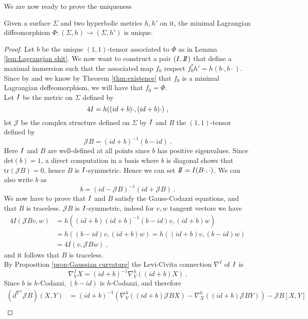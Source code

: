 We are now ready to prove the uniqueness
\begin{theorem}
    Given a surface $\Sigma$ and two hyperbolic metrics $h, h'$ on it, the minimal Lagrangian diffeomorphism $\Phi : (\Sigma, h) \to (\Sigma, h')$ is unique.
\end{theorem}
\begin{proof}
    Let $b$ be the unique $(1,1)$-tensor associated to $\Phi$ as in Lemma \ref{lem:Lagrangian shit}. We now want to construct a pair $(\I,\II)$ that define a maximal immersion such that the associated map $f_0$ respect $f_0^* h' = h(b \cdot, b \cdot)$. Since by  and we know by Theorem \ref{thm:existence} that $f_0$ is a minimal Lagrangian deffeomorphism, we will have that $f_0 = \Phi$.\\
    Let $I$ be the metric on $\Sigma$ defined by
    \[
        4 I = h((id + b)\cdot , (id + b)\cdot ) \ ,
    \]
    let $\mathcal{J}$ be the complex structure defined on $\Sigma$ by $I$ and $B$ the $(1,1)$-tensor defined by
    \[
        \mathcal{J} B = (id + b)^{-1} (b-id) \ .
    \]
    Here $I$ and $B$ are well-defined at all points since $b$ has positive eigenvalues. Since $\text{det}(b)=1$, a direct computation in a basis where $b$ is diagonal shows that $\text{tr}(\mathcal{J} B) = 0 $, hence $B$ is $I$-symmetric. Hence we can set $\II = \I (B \cdot, \cdot)$. We can also write $b$ as
    \[
        b = (id - \mathcal{J}B)^{-1} (id+\mathcal{J}B) \ .
    \]  
    We now have to prove that $I$ and $B$ satisfy the Gauss-Codazzi equations, and that $B$ is traceless.
    $\mathcal{J} B$ is $I$-symmetric, indeed for $v,w$ tangent vectors we have
    \[
    \begin{split}
        4I(\mathcal{J}B v,w) & = h((id + b) (id + b)^{-1} (b-id) v , (id + b)w) \\
        & = h((b-id) v , (id + b)w) = h((id + b) v , (b-id)w) \\
        & = 4 I (v, \mathcal{J}B w) \ ,
    \end{split}
    \]
    and it follows that $B$ is traceless.\\
    By Proposition \ref{prop:Gaussian curvature} the Levi-Civita connection $\nabla^I$ of $I$ is
    \[
        \nabla^I_Y X = (id + b)^{-1} \nabla^h_Y ((id+b)X) \ .
    \]
    Since $b$ is $h$-Codazzi, $(b-id)$ is $h$-Codazzi, and therefore
    \[
    \begin{split}
        (d^{\nabla^I} \mathcal{J}B)(X,Y) & = (id + b)^{-1} (\nabla^h_Y ((id+b)\mathcal{J}B X) - \nabla^h_X ((id+b)\mathcal{J}B Y) ) - \mathcal{J}B \left[ X,Y \right] \\

\end{split}\]
\end{proof}
